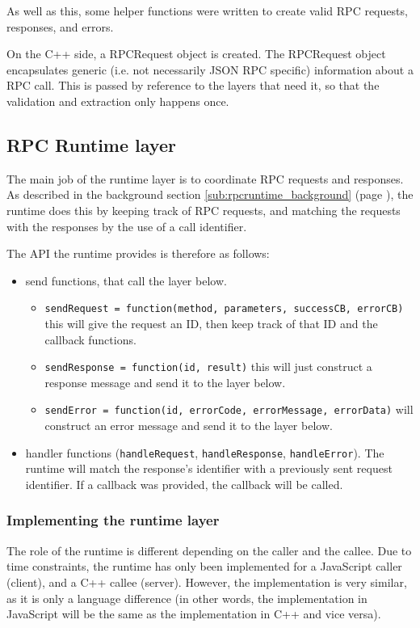 As well as this, some helper functions were written to create valid RPC requests, responses, and errors.

On the C++ side, a RPCRequest object is created. The RPCRequest object encapsulates generic (i.e. not necessarily JSON RPC specific) information about a RPC call. This is passed by reference to the layers that need it, so that the validation and extraction only happens once.



\subsection{RPC Runtime layer} %
\label{sub:rpc_runtime_layer_design}
The main job of the runtime layer is to coordinate RPC requests and responses. As described in the background section \ref{sub:rpcruntime_background} (page \pageref{sub:rpcruntime_background}), the runtime does this by keeping track of RPC requests, and matching the requests with the responses by the use of a call identifier.

The API the runtime provides is therefore as follows:
\begin{itemize}
	\item send functions, that call the layer below.
	\begin{itemize}
		\item \lstinline+sendRequest = function(method, parameters, successCB, errorCB)+ this will give the request an ID, then keep track of that ID and the callback functions.
		\item \lstinline+sendResponse = function(id, result)+ this will just construct a response message and send it to the layer below.
		\item \lstinline+sendError = function(id, errorCode, errorMessage, errorData)+ will construct an error message and send it to the layer below.
	\end{itemize}
	\item handler functions (\lstinline+handleRequest+, \lstinline+handleResponse+, \lstinline+handleError+). The runtime will match the response's identifier with a previously sent request identifier. If a callback was provided, the callback will be called.
\end{itemize}

\subsubsection{Implementing the runtime layer} %
\label{ssub:implementing_the_runtime_layer}
The role of the runtime is different depending on the caller and the callee. Due to time constraints, the runtime has only been implemented for a JavaScript caller (client), and a C++ callee (server). However, the implementation is very similar, as it is only a language difference (in other words, the implementation in JavaScript will be the same as the implementation in C++ and vice versa).

